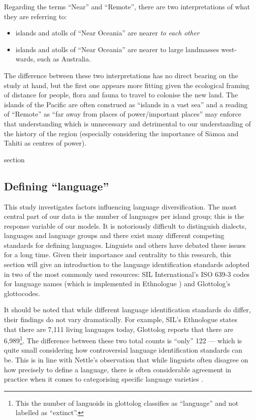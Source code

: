 \documentclass[unnumsec,webpdf,modern,medium]{oup-authoring-template}
\begin{document}
\begin{appendices}
Regarding the terms ``Near'' and ``Remote'', there are two interpretations of what they are referring to:

\begin{itemize}
    \item islands and atolls of ``Near Oceania'' are nearer \emph{to each other} 
    \item islands and atolls of ``Near Oceania'' are nearer to large landmasses west-wards, such as Australia.
\end{itemize}

The difference between these two interpretations has no direct bearing on the study at hand, but the first one appears more fitting given the ecological framing of distance for people, flora and fauna to travel to colonise the new land. The islands of the Pacific are often construed as ``islands in a vast sea'' \citep{hauofa_1993} and a reading of ``Remote'' as ``far away from places of power/important places'' may enforce that understanding which is unnecessary and detrimental to our understanding of the history of the region (especially considering the importance of S\={a}moa and Tahiti as centres of power). 

section
\FloatBarrier
\subsection{Defining ``language''}
\label{sec:language_class}
This study investigates factors influencing language diversification. The most central part of our data is the number of languages per island group; this is the response variable of our models. It is notoriously difficult to distinguish dialects, languages and language groups and there exist many different competing standards for defining languages. Linguists and others have debated these issues for a long time. Given their importance and centrality to this research, this section will give an introduction to the language identification standards adopted in two of the most commonly used resources: SIL International's ISO 639-3 codes for language names (which is implemented in Ethnologue \citep{ethnologue22}) and Glottolog's glottocodes.

It should be noted that while different language identification standards do differ, their findings do not vary dramatically. For example, SIL's Ethnologue states that there are 7,111 living languages today, Glottolog reports that there are 6,989\footnote{This the number of languoids in glottolog classifies as ``language'' and not labelled as ``extinct''.}. The difference between these two total counts is ``only'' 122 --- which is quite small considering how controversial language identification standards can be. This is in line with Nettle's observation that while linguists often disagree on how precisely to define a language, there is often considerable agreement in practice when it comes to categorising specific language varieties \citep[356]{NETTLE1998}.


\end{appendices}
\end{document}
